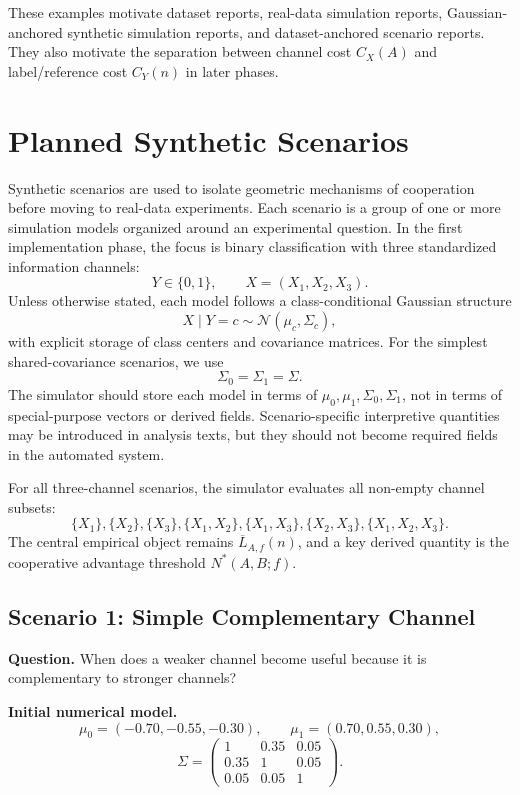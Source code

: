 \documentclass[11pt,a4paper]{article}
\begin{document}
These examples motivate dataset reports, real-data simulation reports, Gaussian-anchored synthetic simulation reports, and dataset-anchored scenario reports. They also motivate the separation between channel cost $C_X(A)$ and label/reference cost $C_Y(n)$ in later phases.

\section{Planned Synthetic Scenarios}

Synthetic scenarios are used to isolate geometric mechanisms of cooperation before moving to real-data experiments. Each scenario is a group of one or more simulation models organized around an experimental question. In the first implementation phase, the focus is binary classification with three standardized information channels:
\[
    Y\in\{0,1\},\qquad X=(X_1,X_2,X_3).
\]
Unless otherwise stated, each model follows a class-conditional Gaussian structure
\[
    X\mid Y=c\sim \mathcal{N}(\mu_c,\Sigma_c),
\]
with explicit storage of class centers and covariance matrices. For the simplest shared-covariance scenarios, we use
\[
    \Sigma_0=\Sigma_1=\Sigma.
\]
The simulator should store each model in terms of $\mu_0,\mu_1,\Sigma_0,\Sigma_1$, not in terms of special-purpose vectors or derived fields. Scenario-specific interpretive quantities may be introduced in analysis texts, but they should not become required fields in the automated system.

For all three-channel scenarios, the simulator evaluates all non-empty channel subsets:
\[
\{X_1\},\{X_2\},\{X_3\},\{X_1,X_2\},\{X_1,X_3\},\{X_2,X_3\},\{X_1,X_2,X_3\}.
\]
The central empirical object remains $\overline{L}_{A,f}(n)$, and a key derived quantity is the cooperative advantage threshold $N^*(A,B;f)$.

\subsection{Scenario 1: Simple Complementary Channel}

\textbf{Question.} When does a weaker channel become useful because it is complementary to stronger channels?

\textbf{Initial numerical model.}
\[
    \mu_0=(-0.70,-0.55,-0.30),
    \qquad
    \mu_1=(0.70,0.55,0.30),
\]
\[
\Sigma=
\begin{pmatrix}
1 & 0.35 & 0.05\\
0.35 & 1 & 0.05\\
0.05 & 0.05 & 1
\end{pmatrix}.
\]
\end{document}
